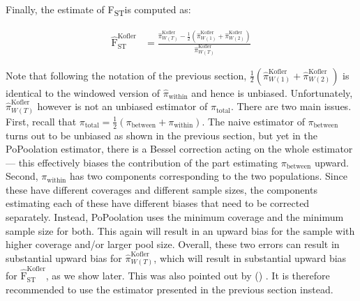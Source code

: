 \documentclass[letterpaper,fontsize=9pt,DIV=12]{scrartcl}
\newcommand\citeay[1]{\citeauthor{#1} (\citeyear{#1}) \cite{#1}}
\newcommand{\fst}{F\textsubscript{ST}}
\begin{document}
Finally, the estimate of \fst is computed as:

\begin{align}
    \label{eq:PoPoolation2FstEst}
    \widehat{\text{F}}_\text{ST}^\text{Kofler} &= \frac{ \widehat{\pi}_{W(T)}^\text{Kofler} - \frac{1}{2} \left(     \widehat{\pi}_{W(1)}^\text{Kofler} +     \widehat{\pi}_{W(2)}^\text{Kofler}  \right)}{ \widehat{\pi}_{W(T)}^\text{Kofler}}
\end{align}

Note that following the notation of the previous section, $\frac{1}{2}\left(\widehat{\pi}_{W(1)}^\text{Kofler} + \widehat{\pi}_{W(2)}^\text{Kofler}\right)$ is identical to the windowed version of $\widehat{\pi}_\text{within}$ and hence is unbiased.  Unfortunately, $\widehat{\pi}_{W(T)}^\text{Kofler}$ however is not an unbiased estimator of $\pi_\text{total}$.  There are two main issues.  First, recall that $\pi_\text{total} = \frac{1}{2}\left(\pi_\text{between}  + \pi_\text{within} \right)$.  The naive estimator of $\pi_\text{between}$ turns out to be unbiased as shown in the previous section, but yet in the PoPoolation estimator, there is a Bessel correction acting on the whole estimator --- this effectively biases the contribution of the part estimating $\pi_\text{between}$ upward.  Second, $\pi_\text{within}$ has two components corresponding to the two populations.  Since these have different coverages and different sample sizes, the components estimating each of these have different biases that need to be corrected separately.  Instead, PoPoolation uses the minimum coverage and the minimum sample size for both.  This again will result in an upward bias for the sample with higher coverage and/or larger pool size.  Overall, these two errors can result in substantial upward bias for $\widehat{\pi}_{W(T)}^\text{Kofler}$, which will result in substantial upward bias for $\widehat{\text{F}}_\text{ST}^\text{Kofler}$, as we show later.  This was also pointed out by \citeay{Hivert2018}. It is therefore recommended to use the estimator presented in the previous section instead.


\end{document}

